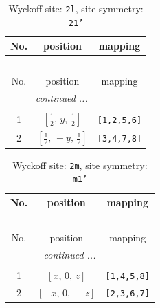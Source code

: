 \documentclass[fleqn,8pt]{jsarticle}
\begin{document}
\renewcommand{\arraystretch}{1.2}
\begin{longtable}{ccc}
\caption{Wyckoff site: {\tt 2l}, site symmetry: {\tt 21'}}
 \\
 \hline \hline
No. & position & mapping \\ \hline \endfirsthead

\multicolumn{2}{l}{\tablename\ \thetable{}} \\
 \hline \hline
No. & position & mapping \\ \hline \endhead

 \hline \hline
\multicolumn{2}{r}{\footnotesize\it continued ...} \\ \endfoot

 \hline \hline
\multicolumn{2}{r}{} \\ \endlastfoot

1 & $\left[ \frac{1}{2},\, y,\, \frac{1}{2} \right]$ & {\tt [1,2,5,6]} \\ \hline
2 & $\left[ \frac{1}{2},\, - y,\, \frac{1}{2} \right]$ & {\tt [3,4,7,8]} \\
\end{longtable}
\renewcommand{\arraystretch}{1.2}
\begin{longtable}{ccc}
\caption{Wyckoff site: {\tt 2m}, site symmetry: {\tt m1'}}
 \\
 \hline \hline
No. & position & mapping \\ \hline \endfirsthead

\multicolumn{2}{l}{\tablename\ \thetable{}} \\
 \hline \hline
No. & position & mapping \\ \hline \endhead

 \hline \hline
\multicolumn{2}{r}{\footnotesize\it continued ...} \\ \endfoot

 \hline \hline
\multicolumn{2}{r}{} \\ \endlastfoot

1 & $\left[ x,\, 0,\, z \right]$ & {\tt [1,4,5,8]} \\ \hline
2 & $\left[ - x,\, 0,\, - z \right]$ & {\tt [2,3,6,7]} \\
\end{longtable}
\renewcommand{\arraystretch}{1.2}
\end{document}
